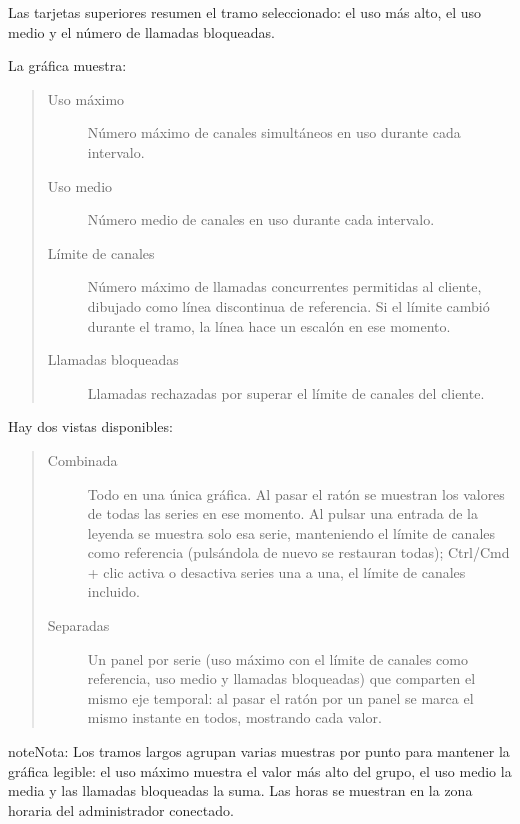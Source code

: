\documentclass[letterpaper,10pt,spanish]{sphinxmanual}
\begin{document}
Las tarjetas superiores resumen el tramo seleccionado: el uso más alto, el uso medio y el número de llamadas bloqueadas.

La gráfica muestra:
\begin{quote}
\begin{description}
\item[{Uso máximo}] \leavevmode
Número máximo de canales simultáneos en uso durante cada intervalo.

\item[{Uso medio}] \leavevmode
Número medio de canales en uso durante cada intervalo.

\item[{Límite de canales}] \leavevmode
Número máximo de llamadas concurrentes permitidas al cliente, dibujado como línea discontinua de referencia. Si el límite cambió durante el tramo, la línea hace un escalón en ese momento.

\item[{Llamadas bloqueadas}] \leavevmode
Llamadas rechazadas por superar el límite de canales del cliente.

\end{description}
\end{quote}

Hay dos vistas disponibles:
\begin{quote}
\begin{description}
\item[{Combinada}] \leavevmode
Todo en una única gráfica. Al pasar el ratón se muestran los valores de todas las series en ese momento. Al pulsar una entrada de la leyenda se muestra solo esa serie, manteniendo el límite de canales como referencia (pulsándola de nuevo se restauran todas); Ctrl/Cmd + clic activa o desactiva series una a una, el límite de canales incluido.

\item[{Separadas}] \leavevmode
Un panel por serie (uso máximo con el límite de canales como referencia, uso medio y llamadas bloqueadas) que comparten el mismo eje temporal: al pasar el ratón por un panel se marca el mismo instante en todos, mostrando cada valor.

\end{description}
\end{quote}

\begin{notice}{note}{Nota:}
Los tramos largos agrupan varias muestras por punto para mantener la gráfica legible: el uso máximo muestra el valor más alto del grupo, el uso medio la media y las llamadas bloqueadas la suma. Las horas se muestran en la zona horaria del administrador conectado.
\end{notice}
\label{administration_portal/client/residential/index:residential-clients}
\end{document}
